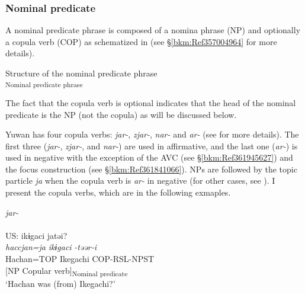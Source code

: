  \subsubsection{Nominal predicate}
\label{bkm:Ref347240067}\hypertarget{RefHeadingToc395696997}{}
A nominal predicate phrase is composed of a nomina phrase (NP) and optionally a copula verb (COP) as schematized in  (see §\ref{bkm:Ref357004964} for more details).

\ea\label{ex:4.12}Structure of the nominal predicate phrase\\
\textsubscript{Nominal predicate phrase}\\
\z

\noindent The fact that the copula verb is optional indicates that the head of the nominal predicate is the NP (not the copula) as will be discussed below.

Yuwan has four copula verbs: \textit{jar-}, \textit{zjar-}, \textit{nar-} and \textit{ar-} (see  for more details). The first three (\textit{jar-}, \textit{zjar-}, and \textit{nar-}) are used in affirmative, and the last one (\textit{ar-}) is used in negative with the exception of the AVC (see §\ref{bkm:Ref361945627}) and the focus construction (see §\ref{bkm:Ref361841066}). NPs are followed by the topic particle \textit{ja} when the copula verb is \textit{ar-} in negative (for other cases, see ). I present the copula verbs, which are \EmphName in the following exmaples.

\ea\label{ex:4.13}
\ea \label{ex:4.13a} {\itshape jar-}\hfill\relax[Co: 110328\_00.txt]\\
   \\
   {US:}   {{ikɨgaci}}  {{jatəi?}}\\
     {\itshape haccjan=ja}  {\itshape ikɨgaci}  {\textit{-təər-i}}\\
     {Hachan=TOP}  {Ikegachi}  {COP-RSL-NPST}\\
     {}  {[NP}  {Copular verb]\textsubscript{Nominal predicate}}\\
     \glt{} ‘Hachan was (from) Ikegachi?’
     
